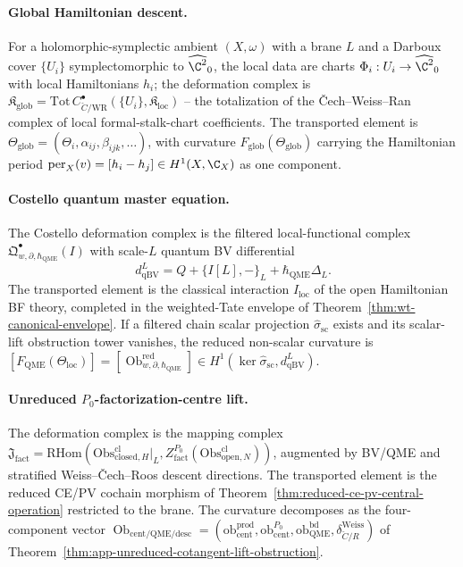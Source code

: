 \paragraph{Global Hamiltonian descent.}  For a holomorphic-symplectic
ambient \((X,\omega)\) with a brane \(L\) and a Darboux cover
\(\{U_i\}\) symplectomorphic to \(\widehat{\C^2}_0\), the local data
are charts \(\Phi_i:U_i\to\widehat{\C^2}_0\) with local Hamiltonians
\(h_i\); the deformation complex is
\(\mathfrak K_{\mathrm{glob}}=
\mathrm{Tot}\,C^\bullet_{\check C/\mathrm{WR}}(\{U_i\},
\mathfrak K_{\mathrm{loc}})\) -- the totalization of the
\v{C}ech--Weiss--Ran complex of local formal-stalk-chart coefficients.
The transported element is
\(\Theta_{\mathrm{glob}}=(\Theta_i,\alpha_{ij},\beta_{ijk},\dots)\),
with curvature
\(F_{\mathrm{glob}}(\Theta_{\mathrm{glob}})\) carrying the Hamiltonian
period \(\operatorname{per}_X(v)=[h_i-h_j]\in H^1(X,\C_X)\) as one
component.

\paragraph{Costello quantum master equation.}  The Costello
deformation complex is the filtered local-functional complex
\(\mathfrak Q^\bullet_{w,\partial,\hbar_{\mathrm{QME}}}(I)\) with scale-\(L\)
quantum BV differential
\[
  d_{\mathrm{qBV}}^L=Q+\{I[L],-\}_L+\hbar_{\mathrm{QME}}\Delta_L .
\]
The transported element is the classical interaction
\(I_{\mathrm{loc}}\) of the open Hamiltonian BF theory, completed in the
weighted-Tate envelope of
Theorem~\ref{thm:wt-canonical-envelope}.  If a filtered chain scalar
projection \(\widehat\sigma_{\mathrm{sc}}\) exists and its
scalar-lift obstruction tower vanishes, the reduced non-scalar
curvature is
\([F_{\mathrm{QME}}(\Theta_{\mathrm{loc}})]
 =[\operatorname{Ob}^{\mathrm{red}}_{w,\partial,\hbar_{\mathrm{QME}}}]
 \in H^1(\ker\widehat\sigma_{\mathrm{sc}},d_{\mathrm{qBV}}^L)\).

\paragraph{\texorpdfstring{Unreduced \(P_0\)-factorization-centre lift.}{Unreduced P-0-factorization-centre lift}}  The
deformation complex is the mapping complex
\(\mathfrak J_{\mathrm{fact}}=\mathrm{RHom}(\mathrm{Obs}^{\mathrm{cl}}_{\mathrm{closed},H}\big|_L,
Z^{P_0}_{\mathrm{fact}}(\mathrm{Obs}^{\mathrm{cl}}_{\mathrm{open},N}))\),
augmented by BV/QME and stratified Weiss--\v{C}ech--Roos descent
directions.  The transported element is the reduced CE/PV cochain
morphism of Theorem~\ref{thm:reduced-ce-pv-central-operation}
restricted to the brane.  The curvature decomposes as the four-component
vector
\(\operatorname{Ob}_{\mathrm{cent/QME/desc}}=
(\mathrm{ob}^{\mathrm{prod}}_{\mathrm{cent}},
\mathrm{ob}^{P_0}_{\mathrm{cent}},
\mathrm{ob}^{\mathrm{bd}}_{\mathrm{QME}},
\delta^{\mathrm{Weiss}}_{\check C/R})\) of
Theorem~\ref{thm:app-unreduced-cotangent-lift-obstruction}.

